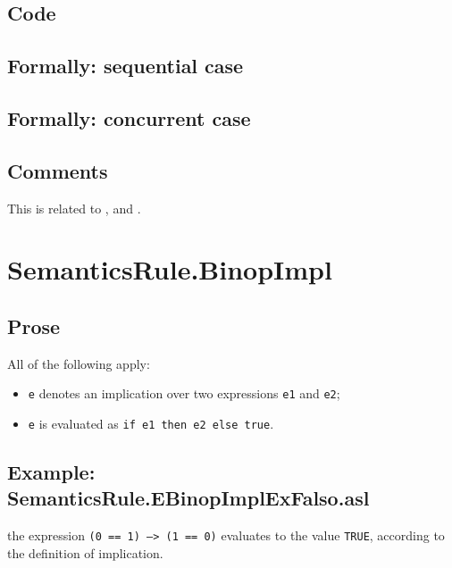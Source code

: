 \documentclass{book}
\begin{document}
  \subsection{Code}

\begin{emptyformal}
  \subsection{Formally: sequential case}

  \subsection{Formally: concurrent case}
\end{emptyformal}

  \subsection{Comments}
  This is related to ,  and .

\section{SemanticsRule.BinopImpl \label{sec:SemanticsRule.BinopImpl}}

  \subsection{Prose}
  All of the following apply:
  \begin{itemize}
  \item \texttt{e} denotes an implication over two expressions \texttt{e1} and \texttt{e2};
  \item \texttt{e} is evaluated as \texttt{if e1 then e2 else true}.
  \end{itemize}

  \subsection{Example: SemanticsRule.EBinopImplExFalso.asl}
the expression \texttt{(0 == 1) --> (1 == 0)} evaluates to the value \texttt{TRUE}, according to the definition of implication.
\end{document}
